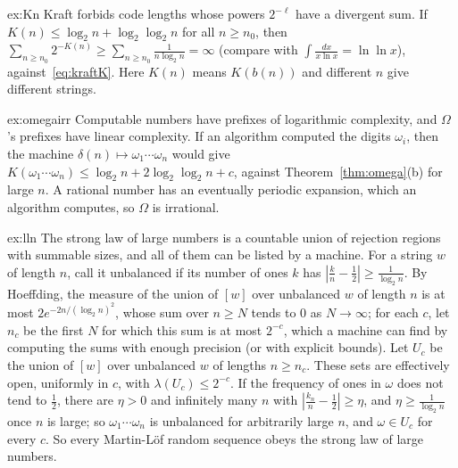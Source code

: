 \begin{solution}{ex:Kn}
\idea Kraft forbids code lengths whose powers $2^{-\ell}$ have a divergent sum.
\writeup If $K(n)\le\log_2n+\log_2\log_2n$ for all $n\ge n_0$, then $\sum_{n\ge n_0}2^{-K(n)}\ge\sum_{n\ge n_0}\frac1{n\log_2n}=\infty$ (compare with $\int\frac{dx}{x\ln x}=\ln\ln x$), against~\eqref{eq:kraftK}. Here $K(n)$ means $K(b(n))$ and different $n$ give different strings.
\end{solution}

\begin{solution}{ex:omegairr}
\idea Computable numbers have prefixes of logarithmic complexity, and $\Omega$'s prefixes have linear complexity.
\writeup If an algorithm computed the digits $\omega_i$, then the machine $\delta(n)\mapsto\omega_1\cdots\omega_n$ would give $K(\omega_1\cdots\omega_n)\le\log_2n+2\log_2\log_2n+c$, against Theorem~\ref{thm:omega}(b) for large $n$. A rational number has an eventually periodic expansion, which an algorithm computes, so $\Omega$ is irrational.
\end{solution}

\begin{solution}{ex:lln}
\idea The strong law of large numbers is a countable union of rejection regions with summable sizes, and all of them can be listed by a machine.
\writeup For a string $w$ of length $n$, call it unbalanced if its number of ones $k$ has $|\frac kn-\frac12|\ge\frac1{\log_2n}$. By Hoeffding, the measure of the union of $[w]$ over unbalanced $w$ of length $n$ is at most $2e^{-2n/(\log_2n)^2}$, whose sum over $n\ge N$ tends to $0$ as $N\to\infty$; for each $c$, let $n_c$ be the first $N$ for which this sum is at most $2^{-c}$, which a machine can find by computing the sums with enough precision (or with explicit bounds). Let $U_c$ be the union of $[w]$ over unbalanced $w$ of lengths $n\ge n_c$. These sets are effectively open, uniformly in $c$, with $\lambda(U_c)\le2^{-c}$. If the frequency of ones in $\omega$ does not tend to $\frac12$, there are $\eta>0$ and infinitely many $n$ with $|\frac{k_n}n-\frac12|\ge\eta$, and $\eta\ge\frac1{\log_2n}$ once $n$ is large; so $\omega_1\cdots\omega_n$ is unbalanced for arbitrarily large $n$, and $\omega\in U_c$ for every $c$. So every Martin-Löf random sequence obeys the strong law of large numbers.
\end{solution}

